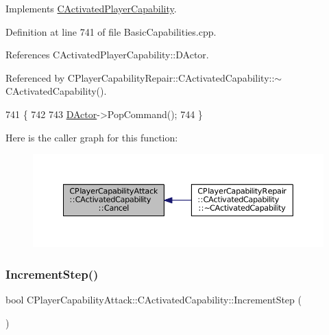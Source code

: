 Implements \hyperlink{classCActivatedPlayerCapability_a5cde83be468e262ad054d81e28684a81}{C\+Activated\+Player\+Capability}.



Definition at line 741 of file Basic\+Capabilities.\+cpp.



References C\+Activated\+Player\+Capability\+::\+D\+Actor.



Referenced by C\+Player\+Capability\+Repair\+::\+C\+Activated\+Capability\+::$\sim$\+C\+Activated\+Capability().


\begin{DoxyCode}
741                                                         \{
742 
743     \hyperlink{classCActivatedPlayerCapability_a54ca944b47bff2718330639941d402b0}{DActor}->PopCommand();
744 \}
\end{DoxyCode}
Here is the caller graph for this function\+:\nopagebreak
\begin{figure}[H]
\begin{center}
\leavevmode
\includegraphics[width=350pt]{classCPlayerCapabilityAttack_1_1CActivatedCapability_a0796fbda8a35b60a2320becfdf2b5c13_icgraph}
\end{center}
\end{figure}
\hypertarget{classCPlayerCapabilityAttack_1_1CActivatedCapability_a6b772cbd6be96fbd9bf88380b143856c}{}\label{classCPlayerCapabilityAttack_1_1CActivatedCapability_a6b772cbd6be96fbd9bf88380b143856c} 
\subsubsection{\texorpdfstring{Increment\+Step()}{IncrementStep()}}
{\footnotesize\ttfamily bool C\+Player\+Capability\+Attack\+::\+C\+Activated\+Capability\+::\+Increment\+Step (\begin{DoxyParamCaption}{ }\end{DoxyParamCaption})\hspace{0.3cm}{\ttfamily [virtual]}}



